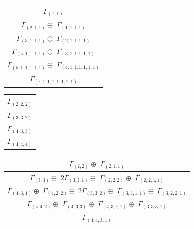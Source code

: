 \documentclass[main.tex]{subfiles}
\begin{document}
\begin{minipage}{.3\textwidth}
\centering
\begin{tabular}{c}
$\Gamma_{(
1 , 
1
)}$
\\ \hline
$\Gamma_{(
2 , 
1 , 
1
)} \oplus$
$\Gamma_{(
1 , 
1 , 
1 , 
1
)}$
\\ \hline
$\Gamma_{(
3 , 
1 , 
1 , 
1
)} \oplus$
$\Gamma_{(
2 , 
1 , 
1 , 
1 , 
1
)}$
\\ \hline
$\Gamma_{(
4 , 
1 , 
1 , 
1 , 
1
)} \oplus$
$\Gamma_{(
3 , 
1 , 
1 , 
1 , 
1 , 
1
)}$
\\ \hline
$\Gamma_{(
5 , 
1 , 
1 , 
1 , 
1 , 
1
)} \oplus$
$\Gamma_{(
4 , 
1 , 
1 , 
1 , 
1 , 
1 , 
1
)}$
\\ \hline
$\Gamma_{(
5 , 
1 , 
1 , 
1 , 
1 , 
1 , 
1 , 
1
)}$
\\
\end{tabular}\end{minipage}
\bigskip
\begin{minipage}{.3\textwidth}
\centering
\begin{tabular}{c}
$\Gamma_{(
2 , 
2 , 
2
)}$
\\ \hline
$\Gamma_{(
3 , 
3 , 
2
)}$
\\ \hline
$\Gamma_{(
4 , 
3 , 
3
)}$
\\ \hline
$\Gamma_{(
4 , 
4 , 
4
)}$
\\
\end{tabular}\end{minipage}
\begin{minipage}{.7\textwidth}
\centering
\begin{tabular}{c}
$\Gamma_{(
2 , 
2
)} \oplus$
$\Gamma_{(
2 , 
1 , 
1
)}$
\\ \hline
$\Gamma_{(
3 , 
3
)} \oplus$
$ 2 \Gamma_{(
3 , 
2 , 
1
)} \oplus$
$\Gamma_{(
2 , 
2 , 
2
)} \oplus$
$\Gamma_{(
2 , 
2 , 
1 , 
1
)}$
\\ \hline
$\Gamma_{(
4 , 
3 , 
1
)} \oplus$
$\Gamma_{(
4 , 
2 , 
2
)} \oplus$
$ 2 \Gamma_{(
3 , 
3 , 
2
)} \oplus$
$\Gamma_{(
3 , 
3 , 
1 , 
1
)} \oplus$
$\Gamma_{(
3 , 
2 , 
2 , 
1
)}$
\\ \hline
$\Gamma_{(
4 , 
4 , 
2
)} \oplus$
$\Gamma_{(
4 , 
3 , 
3
)} \oplus$
$\Gamma_{(
4 , 
3 , 
2 , 
1
)} \oplus$
$\Gamma_{(
3 , 
3 , 
3 , 
1
)}$
\\ \hline
$\Gamma_{(
4 , 
4 , 
3 , 
1
)}$
\\
\end{tabular}\end{minipage}
\bigskip
\end{document}
